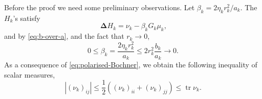 \documentclass[12pt,a4paper,reqno]{amsart}
\renewcommand{\leq}{\leqslant}
\newcommand{\tr}{\operatorname{tr}}
\begin{document}
Before the proof we need some preliminary observations. Let $\beta_k=2\eta_k r_k^2/a_k$. 
The $H_k$'s satisfy
\begin{equation}\label{eq:corrected-Poisson}
 \ \mathbf{\Delta}H_k=\nu_k-\beta_kG_k\mu_k,
\end{equation}
and by \eqref{eq:b-over-a}, and the fact that $r_k\to 0$,
\begin{equation}\label{eq:beta-to-zero}
 0\leq\beta_k=\frac{2\eta_kr_k^2}{a_k}
 \leq2r_k^2\frac{b_k}{a_k}\to 0.
\end{equation}
As a consequence of \eqref{eq:polarised-Bochner}, we obtain the following inequality of scalar measures,
\begin{equation}\label{eq:entry-TV-by-trace}
 |(\nu_k)_{ij}|
 \leq\frac12\left((\nu_k)_{ii}+(\nu_k)_{jj}\right)
 \leq\tr\nu_k.
\end{equation}
\end{document}
